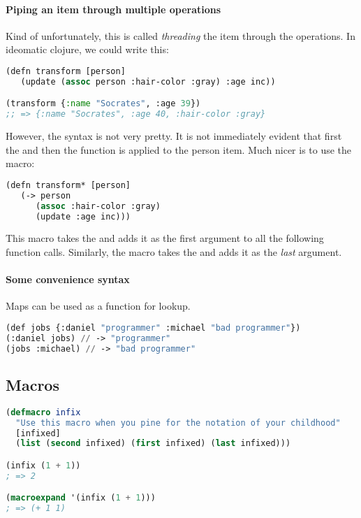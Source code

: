 \paragraph{Piping an item through multiple operations}
Kind of unfortunately, this is called \emph{threading} the item through the operations. In ideomatic clojure, we could write this: 

\begin{lstlisting}[language=lisp]
(defn transform [person]
   (update (assoc person :hair-color :gray) :age inc))

(transform {:name "Socrates", :age 39})
;; => {:name "Socrates", :age 40, :hair-color :gray}
\end{lstlisting}

However, the syntax is not very pretty. It is not immediately evident that first the  and then the  function is applied to the person item. Much nicer is to use the \inlinecode{->} macro:

\begin{lstlisting}[language=lisp]
(defn transform* [person]
   (-> person
      (assoc :hair-color :gray)
      (update :age inc)))
\end{lstlisting}

This macro takes the  and adds it as the first argument to all the following function calls. Similarly, the \inlinecode{->>} macro takes the  and adds it as the \emph{last} argument. 


\paragraph{Some convenience syntax} Maps can be used as a function for lookup.
\begin{lstlisting}[language=lisp]
(def jobs {:daniel "programmer" :michael "bad programmer"})
(:daniel jobs) // -> "programmer"
(jobs :michael) // -> "bad programmer"
\end{lstlisting}

\subsection{Macros}

\begin{lstlisting}[language=lisp]
(defmacro infix
  "Use this macro when you pine for the notation of your childhood"
  [infixed]
  (list (second infixed) (first infixed) (last infixed)))

(infix (1 + 1))
; => 2

(macroexpand '(infix (1 + 1)))
; => (+ 1 1)
\end{lstlisting}


